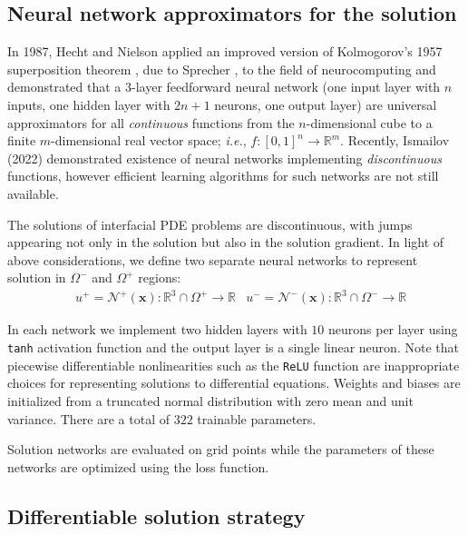 \documentclass{elsarticle}
\begin{document}
\subsection{Neural network approximators for the solution}

In 1987, Hecht and Nielson \cite{hecht1987kolmogorov} applied an improved version of Kolmogorov's 1957 superposition theorem \cite{kolmogorov1957representation}, due to Sprecher \cite{sprecher1965structure}, to the field of neurocomputing and demonstrated that a $3$-layer feedforward neural network (one input layer with $n$ inputs, one hidden layer with $2n+1$ neurons, one output layer) are universal approximators for all \textit{continuous} functions from the $n$-dimensional cube to a finite $m$-dimensional real vector space; \textit{i.e.}, $f: [0,1]^n \rightarrow \mathbb{R}^m $. Recently, Ismailov (2022) \cite{ismailov2022} demonstrated existence of neural networks implementing \textit{discontinuous} functions, however efficient learning algorithms for such networks are not still available. 

The solutions of interfacial PDE problems are discontinuous, with jumps appearing not only in the solution but also in the solution gradient. In light of above considerations, we define two separate neural networks to represent solution in $\Omega^-$ and $\Omega^+$ regions:
\begin{align*}
& u^+ = \mathcal{N}^+(\mathbf{x}): \mathbb{R}^3\cap \Omega^+ \rightarrow \mathbb{R}  & u^- = \mathcal{N}^-(\mathbf{x}): \mathbb{R}^3\cap \Omega^- \rightarrow \mathbb{R}
\end{align*}

In each network we implement two hidden layers with $10$ neurons per layer using \texttt{tanh} activation function and the output layer is a single linear neuron. Note that piecewise differentiable nonlinearities such as the \texttt{ReLU} function are inappropriate choices for representing solutions to differential equations. Weights and biases are initialized from a truncated normal distribution with zero mean and unit variance. There are a total of $322$ trainable parameters.

Solution networks are evaluated on grid points while the parameters of these networks are optimized using the loss function.



\subsection{Differentiable solution strategy}
\end{document}
